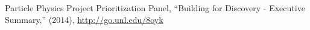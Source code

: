 \begin{thebibliography}{99}





%
%

Particle Physics Project Prioritization Panel, ``Building for Discovery - Executive Summary,'' (2014), \url{http://go.unl.edu/8oyk}


\end{thebibliography}

